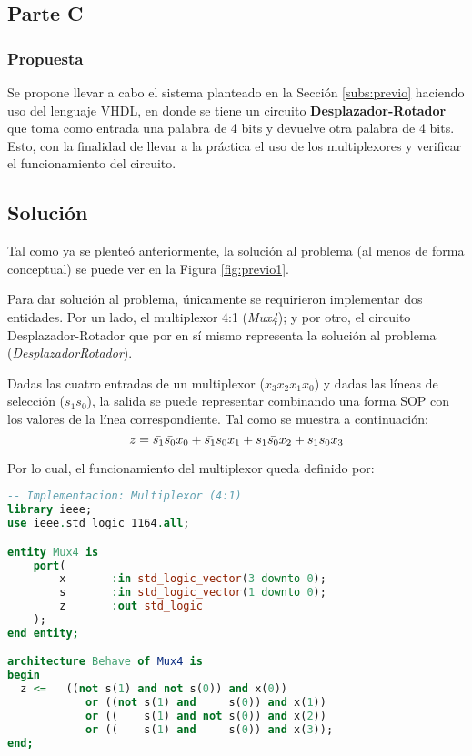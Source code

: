 \documentclass[../procedimientos.tex]{subfiles}
\begin{document}
\clearpage
\subsection{Parte C}
\subsubsection*{Propuesta}
\begin{em}
  Se propone llevar a cabo el sistema planteado en la Sección 
  \ref{subs:previo} haciendo uso del lenguaje VHDL, en donde se tiene un 
  circuito \textbf{Desplazador-Rotador} que toma como entrada una palabra de 4 
  bits y devuelve otra palabra de 4 bits. Esto, con la finalidad de llevar a 
  la práctica el uso de los multiplexores y verificar el funcionamiento del 
  circuito.
\end{em}

\subsection*{Solución}
Tal como ya se plenteó anteriormente, la solución al problema (al menos de 
forma conceptual) se puede ver en la Figura \ref{fig:previo1}.

Para dar solución al problema, únicamente se requirieron implementar dos 
entidades. Por un lado, el multiplexor 4:1 (\textit{Mux4}); y por otro, el 
circuito Desplazador-Rotador que por en sí mismo representa la solución al 
problema (\textit{DesplazadorRotador}).

Dadas las cuatro entradas de un multiplexor ($x_3 x_2 x_1 x_0$) y dadas las 
líneas de selección ($s_1 s_0$), la salida se puede representar combinando una 
forma SOP con los valores de la línea correspondiente. Tal como se muestra a 
continuación:
\[z = \bar{s_1} \bar{s_0} x_0 + \bar{s_1} s_0 x_1 + s_1 \bar{s_0} x_2 + s_1 s_0 x_3\]

Por lo cual, el funcionamiento del multiplexor queda definido por:
\begin{lstlisting}[language=VHDL]
-- Implementacion: Multiplexor (4:1)
library ieee;
use ieee.std_logic_1164.all;

entity Mux4 is
	port(
		x		:in std_logic_vector(3 downto 0);
		s		:in std_logic_vector(1 downto 0);
		z		:out std_logic
	);
end entity;

architecture Behave of Mux4 is
begin
  z <= 	 ((not s(1) and not s(0)) and x(0))
			or ((not s(1) and     s(0)) and x(1))
			or ((    s(1) and not s(0)) and x(2))
			or ((    s(1) and     s(0)) and x(3));
end;
\end{lstlisting}
\end{document}
